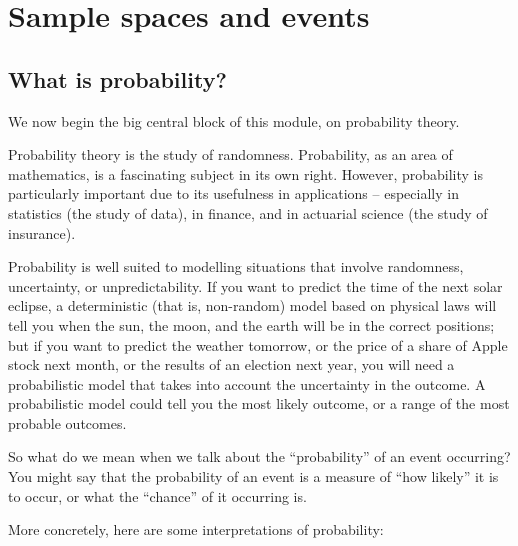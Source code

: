 \documentclass[
  a4paper,
]{book}
\theoremstyle{definition}
\theoremstyle{definition}
\theoremstyle{definition}
\theoremstyle{definition}
\theoremstyle{remark}
\begin{document}
\hypertarget{L03-events}{%
\chapter{Sample spaces and events}\label{L03-events}}

\renewcommand{\complement}{\mathsf{c}}
\newcommand{\comp}{\complement}
\newcommand{\ff}[2]{{#1}^{\underline{#2}}}

\hypertarget{what-is-prob}{%
\section{What is probability?}\label{what-is-prob}}

We now begin the big central block of this module, on probability theory.

Probability theory is the study of randomness. Probability, as an area of mathematics, is a fascinating subject in its own right. However, probability is particularly important due to its usefulness in applications -- especially in statistics (the study of data), in finance, and in actuarial science (the study of insurance).

Probability is well suited to modelling situations that involve randomness, uncertainty, or unpredictability. If you want to predict the time of the next solar eclipse, a deterministic (that is, non-random) model based on physical laws will tell you when the sun, the moon, and the earth will be in the correct positions; but if you want to predict the weather tomorrow, or the price of a share of Apple stock next month, or the results of an election next year, you will need a probabilistic model that takes into account the uncertainty in the outcome. A probabilistic model could tell you the most likely outcome, or a range of the most probable outcomes.

So what do we mean when we talk about the ``probability'' of an event occurring? You might say that the probability of an event is a measure of ``how likely'' it is to occur, or what the ``chance'' of it occurring is.

More concretely, here are some interpretations of probability:
\end{document}

